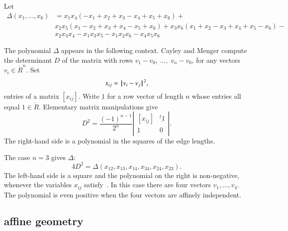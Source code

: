 \begin{definition}[$\Delta$]\label{def:delta}  Let 
$$
\begin{array}{lll}
\Delta(x_1,\ldots,x_6) &= x_1 x_4 (- x_1+x_2+x_3- x_4+x_5+x_6)+\\&
            x_2 x_5 (x_1- x_2+x_3+x_4- x_5+x_6)
            +x_3 x_6 (x_1+x_2- x_3+x_4+x_5- x_6)
            - \\&x_2 x_3 x_4- x_1 x_3 x_5- x_1 x_2 x_6- x_4 x_5 x_6
\end{array}
$$
\end{definition}
%
%

The polynomial $\Delta$ appears in the following context.
Cayley and Menger compute the determinant $D$ of the
matrix with rows $v_1-v_0$, $\ldots,$ $v_n-v_0$, 
for any vectors $v_i\in\ring{R}^n$.   Set
\begin{equation}\label{eqn:xij}
x_{ij} = {\hskip0.1em|\hskip-0.15em|\hskip0.1em}v_i - v_j{\hskip0.1em|\hskip-0.15em|\hskip0.1em}^2,
\end{equation}
entries of a matrix $[x_{ij}]$.
Write $\underbar 1$ for a row vector of length $n$ 
whose entries all equal $1\in\ring{R}$.
Elementary matrix manipulations give
$$
D^2 = \frac{(-1)^{n-1}}{2^n}
    \left|\begin{matrix}[x_{ij}]& {}^t{\underbar 1}\\ {\underbar 1}& 0
        \end{matrix}\right|.
$$
The right-hand side is a polynomial in the squares of the edge lengths.

The case $n=3$ gives $\Delta$:
$$
4 D^2 = \Delta(x_{12},x_{13},x_{14},x_{34},x_{24},x_{23}).
$$
The
left-hand side is a square and the polynomial on the right is
non-negative, whenever the variables $x_{ij}$ satisfy~.  In this case there 
are four vectors $v_1,\ldots,v_4$.  
The polynomial is even positive when the four vectors are affinely independent.
%
%
%
%


%





\subsection{affine geometry}




